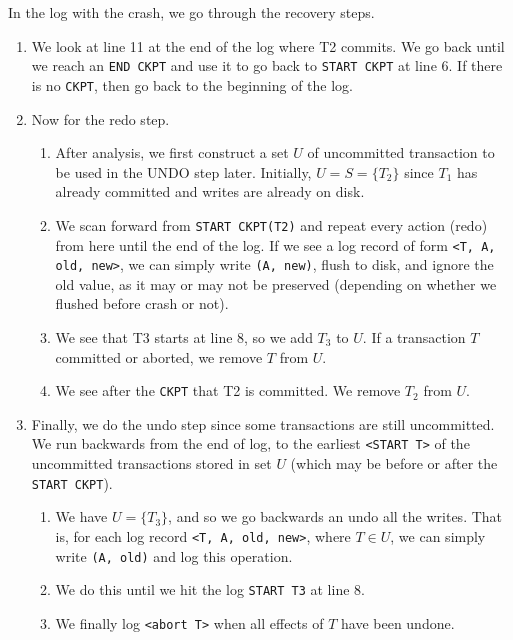 \documentclass{article}
\begin{document}
\begin{example}
        In the log with the crash, we go through the recovery steps. 
        \begin{enumerate}
          \item We look at line 11 at the end of the log where T2 commits. We go back until we reach an \texttt{END CKPT} and use it to go back to \texttt{START CKPT} at line 6. If there is no \texttt{CKPT}, then go back to the beginning of the log. 
          \item Now for the redo step. 
            \begin{enumerate}
              \item After analysis, we first construct a set $U$ of uncommitted transaction to be used in the UNDO step later. Initially, $U = S = \{T_2\}$ since $T_1$ has already committed and writes are already on disk.  
              \item We scan forward from \texttt{START CKPT(T2)} and repeat every action (redo) from here until the end of the log. If we see a log record of form \texttt{<T, A, old, new>}, we can simply write \texttt{(A, new)}, flush to disk, and ignore the old value, as it may or may not be preserved (depending on whether we flushed before crash or not). 
              \item We see that T3 starts at line 8, so we add $T_3$ to $U$. If a transaction $T$ committed or aborted, we remove $T$ from $U$. 
              \item We see after the \texttt{CKPT} that T2 is committed. We remove $T_2$ from $U$. 
            \end{enumerate}
          \item Finally, we do the undo step since some transactions are still uncommitted. We run backwards from the end of log, to the earliest \texttt{<START T>} of the uncommitted transactions stored in set $U$ (which may be before or after the \texttt{START CKPT}). 
            \begin{enumerate}
              \item We have $U = \{T_3\}$, and so we go backwards an undo all the writes. That is, for each log record \texttt{<T, A, old, new>}, where $T \in U$, we can simply write \texttt{(A, old)} and log this operation. 
              \item We do this until we hit the log \texttt{START T3} at line 8. 
              \item We finally log \texttt{<abort T>} when all effects of $T$ have been undone. 
            \end{enumerate}
        \end{enumerate}
      \end{example}
\end{document}
